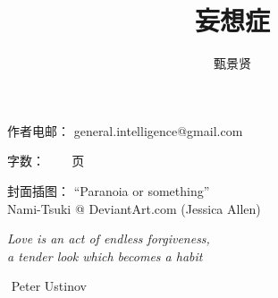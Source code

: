 \documentclass[12pt]{report}
\newcommand{\tab}{\hspace*{1cm}}
\newcommand*\dashh{\textemdash\,\,}
\begin{document}

\cleardoublepage
\title{\Huge{妄想症}}
\author{甄景贤}



\FPsub\resulta{\thedatezero}{\thedateone}
\FPdiv{}
\FPround{}

\FPsub\resultc{\thedatezero}{\thedatetwo}
\FPdiv{}
\FPround{}

\large

{\let\newpage\relax\maketitle}

\maketitle
\setlength{\parindent}{0em}
\setlength{\parskip}{2.8ex}

\small

\begin{center}

作者电邮： general.intelligence@gmail.com

字数：   ~~~\pageref*{LastPage} 页

封面插图：  ``Paranoia or something'' \\
Nami-Tsuki @ DeviantArt.com (Jessica Allen)
\end{center}
\large

\newpage
{}

\tab\tab\tab \parbox{9cm}{\textit{Love is an act of endless forgiveness,\\
a tender look which becomes a habit}}
\vspace{0.5cm}
\begin{flushright}
\dashh Peter Ustinov \hspace*{3cm}
\end{flushright}
\end{document}
